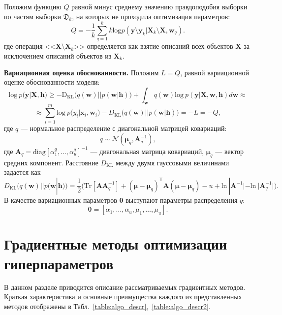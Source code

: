 Положим функцию $Q$ равной минус среднему значению правдоподобия выборки по частям выборки $\mathfrak{D}_k$, на которых не проходила оптимизация параметров:
\[
Q = -\frac{1}{k}\sum_{q=1}^k k\text{log}p(\mathbf{y} \setminus \mathbf{y}_k|\mathbf{X}_k \setminus \mathbf{X}, \mathbf{w}_q).
\]
где операция <<$\mathbf{X} \setminus \mathbf{X}_k$>> определяется как взятие описаний всех объектов $\mathbf{X}$ за исключением описаний объектов из $\mathbf{X}_k$.


\textbf{Вариационная оценка обоснованности. }
Положим $L=Q$, равной вариационной оценке обоснованности модели:
\begin{equation} 
\text{log}~p(\mathbf{y}|\mathbf{X},\mathbf{h})  
\geq 
-\text{D}_\text{KL} \bigl(q(\mathbf{w})||p(\mathbf{w}|\mathbf{h})\bigr) + \int_{\mathbf{w}} q(\mathbf{w})\text{log}~{p(\mathbf{y}|\mathbf{X},\mathbf{w},\mathbf{h})} d \mathbf{w}  \approx
\label{eq:hyper_elbo}
\end{equation}
\[
\approx \sum_{i=1}^m \text{log}~p({y}_i|\mathbf{x}_i, \mathbf{w}_i) - D_\text{KL}\bigl(q (\mathbf{w}) || p (\mathbf{w}|\mathbf{h})\bigr) = -L = -Q,
\]
где $q$ --- нормальное распределение с диагональной матрицей ковариаций:
\begin{equation}
	q \sim \mathcal{N}(\boldsymbol{\mu}_q, \mathbf{A}^{-1}_q),
\label{eq:diag}
\end{equation}
где $\mathbf{A}_q = \text{diag}[\alpha^q_1, \dots, \alpha^q_u]^{-1}$ --- диагональная матрица ковариаций, $\boldsymbol{\mu}_q$ --- вектор средних компонент.
Расстояние $D_\text{KL}$ между двумя гауссовыми величинами задается как 
\[
	D_\text{KL}\bigl(q (\mathbf{w}) || p (\mathbf{w}|\mathbf{h})\bigr) = \frac{1}{2} \bigl( \text{Tr} [\mathbf{A}\mathbf{A}^{-1}_q] + (\boldsymbol{\mu} - \boldsymbol{\mu}_q)^\mathsf{T}\mathbf{A}(\boldsymbol{\mu} - \boldsymbol{\mu}_q) - u +\text{ln}~|\mathbf{A}^{-1}| - \text{ln}~|\mathbf{A}_q^{-1}| \bigr).
\]
В качестве вариационных параметров $\boldsymbol{\theta}$ выступают параметры распределения $q$:
\[
\boldsymbol{\theta} = [\alpha_1, \dots, \alpha_u, {\mu}_1,\dots,{\mu}_u].
\]




\section{Градиентные методы оптимизации гиперпараметров}
В данном разделе приводится описание рассматриваемых градиентных методов.
Краткая характеристика и основные преимущества каждого из представленных методов отображены в Табл.~\ref{table:algo_descr},~\ref{table:algo_descr2}.



